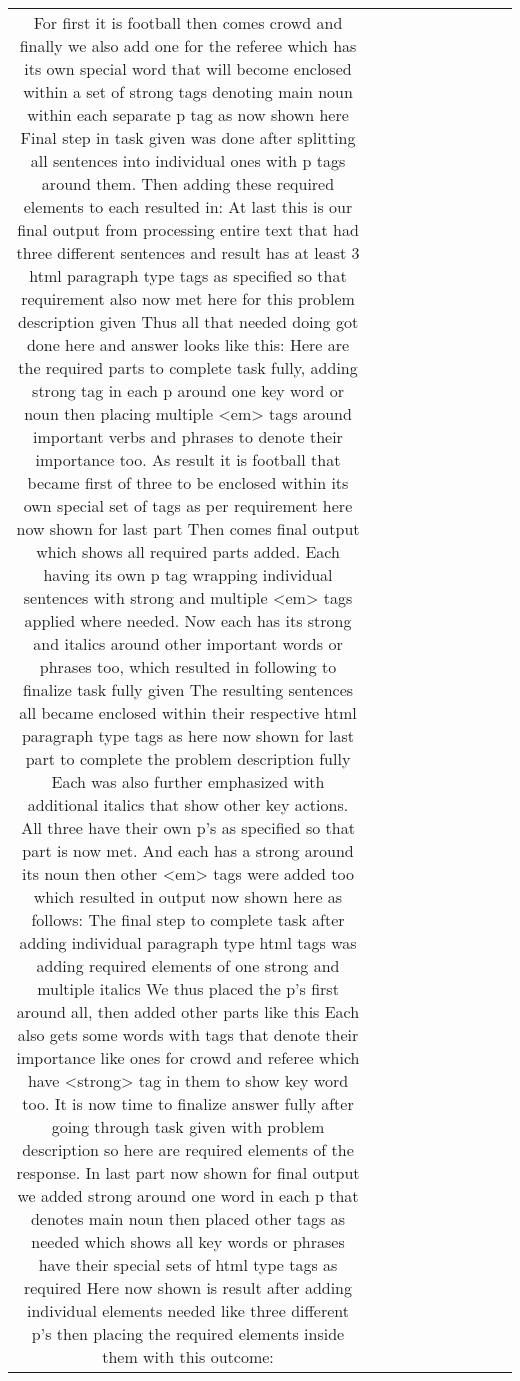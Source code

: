 \begin{table}[h!]
\begin{tabular}{|c|c|c|c|c|c|c|c|c|c|}
For first it is football then comes crowd and finally we also add one for the referee which has its own special word that will become enclosed within a set of strong tags denoting main noun within each separate p tag as now shown here 
Final step in task given was done after splitting all sentences into individual ones with p tags around them. Then adding these required elements to each resulted in: 
At last this is our final output from processing entire text that had three different sentences and result has at least 3 html paragraph type tags as specified so that requirement also now met here for this problem description given
Thus all that needed doing got done here and answer looks like this:
Here are the required parts to complete task fully, adding strong tag in each p around one key word or noun then placing multiple <em> tags around important verbs and phrases to denote their importance too.
As result it is football that became first of three to be enclosed within its own special set of tags as per requirement here now shown for last part 
Then comes final output which shows all required parts added. Each having its own p tag wrapping individual sentences with strong and multiple <em> tags applied where needed.
Now each has its strong and italics around other important words or phrases too, which resulted in following to finalize task fully given
The resulting sentences all became enclosed within their respective html paragraph type tags as here now shown for last part to complete the problem description fully 
Each was also further emphasized with additional italics that show other key actions.
All three have their own p's as specified so that part is now met. And each has a strong around its noun then other <em> tags were added too which resulted in output now shown here as follows:
The final step to complete task after adding individual paragraph type html tags was adding required elements of one strong and multiple italics
We thus placed the p's first around all, then added other parts like this 
Each also gets some words with tags that denote their importance like ones for crowd and referee which have <strong> tag in them to show key word too.
It is now time to finalize answer fully after going through task given with problem description so here are required elements of the response.
In last part now shown for final output we added strong around one word in each p that denotes main noun then placed other tags as needed which shows all key words or phrases have their special sets of html type tags as required 
Here now shown is result after adding individual elements needed like three different p's then placing the required elements inside them with this outcome:

\end{tabular}
\end{table}
